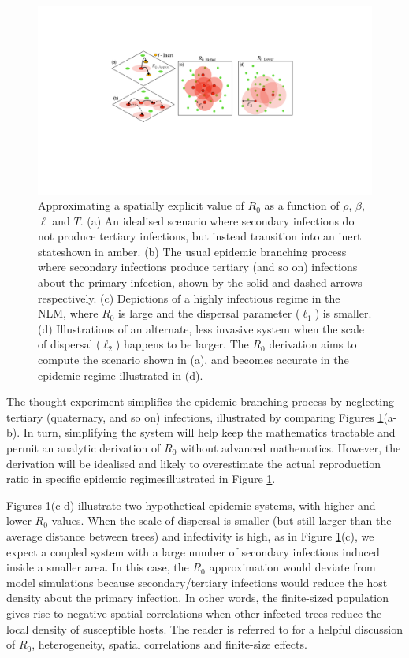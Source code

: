 \begin{figure}
    \centering
    \includegraphics[scale=0.45]{chapter5/figures/fig3a-R0-approx.pdf}
    \caption{
    Approximating a spatially explicit value of $R_0$ as a function of $\rho$, $\beta$, $\ell$ and $T$.
    (a) An idealised scenario where secondary infections do not produce tertiary infections, but instead transition into an inert state\textemdash shown in amber.
    (b) The usual epidemic branching process where secondary infections produce tertiary (and so on) infections about the primary infection, shown by the solid and dashed arrows respectively.
    (c) Depictions of a highly infectious regime in the NLM, where $R_0$ is large and the dispersal parameter ($\ell_1$) is smaller.
    (d) Illustrations of an alternate, less invasive system when the scale of dispersal ($\ell_2$) happens to be larger. 
    The $R_0$ derivation aims to compute the scenario shown in (a), and becomes accurate in the epidemic regime illustrated in (d).
    }
    \label{fig:R0-approx}
\end{figure}

The thought experiment simplifies the epidemic branching process by neglecting tertiary (quaternary, and so on) infections,
illustrated by comparing Figures \ref{fig:R0-approx}(a-b). In turn, simplifying the system will help keep the mathematics tractable and permit an analytic derivation of $R_0$ without advanced mathematics. However, the derivation will be idealised and likely to overestimate the actual reproduction ratio in specific epidemic regimes\textemdash illustrated in Figure \ref{fig:R0-approx}.

Figures \ref{fig:R0-approx}(c-d) illustrate two hypothetical epidemic systems, with higher and lower $R_0$ values.
When the scale of dispersal is smaller (but still larger than the average distance between trees) and infectivity is high, as in Figure \ref{fig:R0-approx}(c), we expect a coupled system with a large number of secondary infectious induced inside a smaller area. In this case, the $R_0$ approximation would deviate from model simulations because secondary/tertiary infections would reduce the host density about the primary infection.
In other words, the finite-sized population gives rise to negative spatial correlations when other infected trees reduce the local density of susceptible hosts. The reader is referred to \cite{R0-perc-ref} for a helpful discussion of $R_0$, heterogeneity, spatial correlations and finite-size effects.

